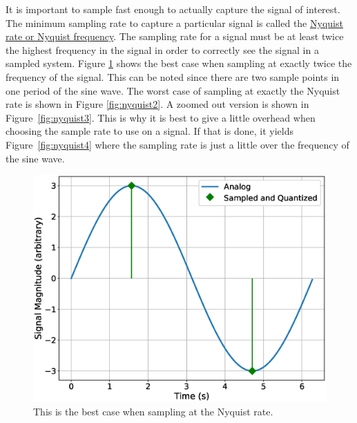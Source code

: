 It is important to sample fast enough to actually capture the signal of interest. The minimum 
sampling rate to capture a particular signal is called the  
\href{https://en.wikipedia.org/wiki/Nyquist_frequency}{Nyquist rate or Nyquist frequency}. The 
sampling rate for a signal must be at least twice the highest frequency in the signal in order 
to correctly see the signal in a sampled system. Figure \ref{fig:nyquist1} shows the best case 
when sampling at exactly twice the frequency of the signal. This can be noted since there are 
two sample points in one period of the sine wave. The worst case of sampling at exactly the 
Nyquist rate is shown in Figure \ref{fig:nyquist2}. A zoomed out version is shown in 
Figure~\ref{fig:nyquist3}. This is why it is best to give a little overhead when choosing 
the sample rate to use on a signal. If that is done, it yields Figure~\ref{fig:nyquist4} where 
the sampling rate is just a little over the frequency of the sine wave.

\begin{figure}[!htb]
	\centering
	\includegraphics[scale=0.5]{dataCollection/nyquist1.eps}
	\caption{This is the best case when sampling at the Nyquist rate.}
	\label{fig:nyquist1}
\end{figure}

